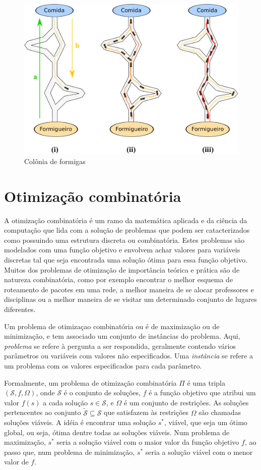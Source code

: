 \begin{figure}
\centering
 \includegraphics[scale=0.5]{fig/formigueiro-crop.pdf}
\caption{Colônia de formigas}
\label{fig:formigueiro}
\end{figure}


\section{Otimização combinatória}
A otimização combinatória é um ramo da matemática aplicada e da ciência da
computação que lida com a solução de problemas que podem ser catacterizados
como possuindo uma estrutura discreta ou combinatória. Estes problemas são
modelados com uma função objetivo e envolvem achar valores para variáveis
discretas tal que seja encontrada uma solução ótima para essa função objetivo.
Muitos dos problemas de otimização de importância teórica e prática são de
natureza combinatória, como por exemplo encontrar o melhor esquema de roteamento
de pacotes em uma rede, a melhor maneira de se alocar professores e disciplinas ou a
melhor maneira de se visitar um determinado conjunto de lugares diferentes. 

Um problema de otimizaçao combinatória ou é de maximização ou de minimização, e
tem associado um conjunto de instâncias do problema. Aqui, \textit{problema} se
refere à pergunta a ser respondida, geralmente contendo vários parâmetros ou
variáveis com valores não especificados. Uma \textit{instância} se refere a um
problema com os valores especificados para cada parâmetro.

Formalmente, um problema de otimização combinatória $\Pi$ é uma tripla
$(\mathcal{S}, f, \Omega)$, onde $\mathcal{S}$ é o conjunto de soluções, $f$ é
a função objetivo que atribui um valor $f(s)$ a cada solução $s \in
\mathcal{S}$, e $\Omega$ é um conjunto de restrições. As soluções pertencentes
ao conjunto $\tilde{\mathcal{S}} \subseteq \mathcal{S}$ que satisfazem às
restrições $\Omega$ são chamadas soluções viáveis. A idéia é encontrar uma
solução $s^{*}$, viável, que seja um ótimo global, ou seja, ótima dentre
todas as soluções viáveis. Num problema de maximização, $s^{*}$ seria a solução
viável com o maior valor da função objetivo $f$, ao passo que, num problema de
minimização, $s^{*}$ seria a solução viável com o menor valor de $f$.

